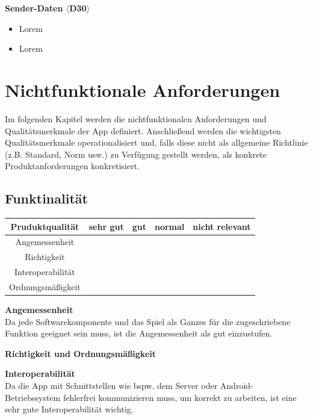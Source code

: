 \documentclass[parskip=full]{scrartcl}
\begin{document}
\textbf{Sender-Daten $\langle$D30$\rangle$}
\begin{itemize}
    \item Lorem
    \item Lorem
\end{itemize}

\section{Nichtfunktionale Anforderungen}
Im folgenden Kapitel werden die nichtfunktionalen Anforderungen und Qualitätsmerkmale der App definiert.
Anschließend werden die wichtigsten Qualitätsmerkmale operationalisiert und, falls diese nicht als allgemeine Richtlinie (z.B. Standard, Norm usw.) zu Verfügung gestellt werden,
als konkrete Produktanforderungen konkretisiert.

\subsection{Funktinalität}
\begin{tabular}{| c | c | c | c | c |}
    \hline
    \textbf{Pruduktqualität} & \textbf{sehr gut} & \textbf{gut} & \textbf{normal} & \textbf{nicht relevant} \\ \hline
    Angemessenheit           &                   &              &                 &                         \\ \hline
    Richtigkeit              &                   &              &                 &                         \\ \hline
    Interoperabilität        &                   &              &                 &                         \\ \hline
    Ordnungsmäßigkeit        &                   &              &                 &                         \\ \hline
\end{tabular}

\textbf{Angemessenheit}\\
Da jede Softwarekomponente und das Spiel als Ganzes für die zugeschriebene Funktion geeignet sein muss, ist die Angemessenheit als gut einzustufen.

\textbf{Richtigkeit und Ordnungsmäßigkeit}

\textbf{Interoperabilität}\\
Da die App mit Schnittstellen wie bspw. dem Server oder Android-Betriebssystem fehlerfrei kommunizieren muss, um korrekt zu arbeiten, ist eine sehr gute Interoperabilität wichtig.
\end{document}
